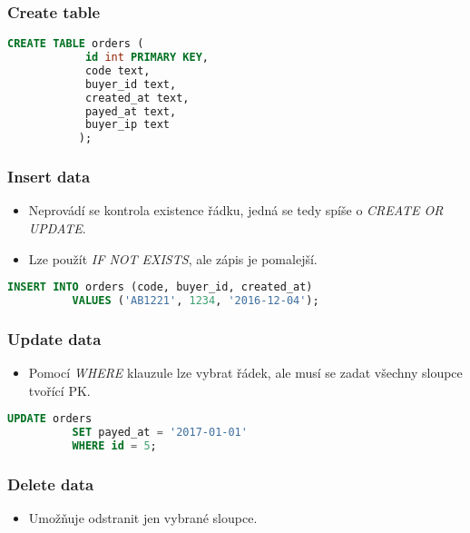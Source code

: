 \documentclass{article}
\begin{document}
      \subsubsection{Create table}
        \begin{lstlisting}[language=sql]
          CREATE TABLE orders (
            id int PRIMARY KEY,
            code text,
            buyer_id text,
            created_at text,
            payed_at text,
            buyer_ip text
           );
        \end{lstlisting}

      \subsubsection{Insert data}
        \begin{itemize}
          \item Neprovádí se kontrola existence řádku, jedná se tedy spíše o \emph{CREATE OR UPDATE}.
          \item Lze použít \emph{IF NOT EXISTS}, ale zápis je pomalejší.
        \end{itemize}

        \begin{lstlisting}[language=sql]
          INSERT INTO orders (code, buyer_id, created_at)
          VALUES ('AB1221', 1234, '2016-12-04');
        \end{lstlisting}

      \subsubsection{Update data}
        \begin{itemize}
          \item Pomocí \emph{WHERE} klauzule lze vybrat řádek, ale musí se zadat všechny sloupce tvořící PK.
        \end{itemize}

        \begin{lstlisting}[language=sql]
          UPDATE orders
          SET payed_at = '2017-01-01'
          WHERE id = 5;
        \end{lstlisting}

      \subsubsection{Delete data}
        \begin{itemize}
          \item Umožňuje odstranit jen vybrané sloupce.
        \end{itemize}
\end{document}
